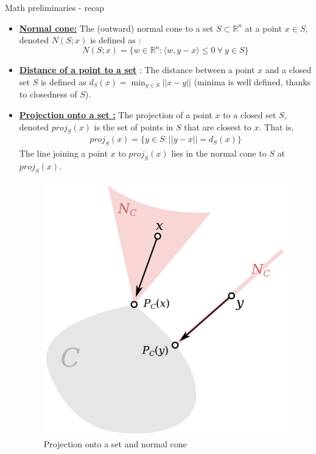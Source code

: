 \documentclass[8pt,aspectratio=169]{beamer}
\begin{document}
\begin{frame}{Math preliminaries - recap}
    \begin{itemize}
        \item \textbf{\underline{Normal cone:}} The (outward) normal cone to a set $S\subset \mathbb{R}^n$ at a point $x \in S$, denoted $N(S; x)$ is defined as :
            \begin{equation*}
                N(S; x) = \{ w \in \mathbb{R}^n : \langle w, y-x\rangle \leq 0 \ \forall \ y \in S \}
            \end{equation*}
        \item \textbf{\underline{Distance of a point to a set}} : The distance between a point $x$ and a closed set $S$ is defined as $d_S(x) = \min_{y\in S}||x-y||$ (minima is well defined, thanks to closedness of $S$).
        \item \textbf{\underline{Projection onto a set :}} The projection of a point $x$ to a closed set $S$, denoted $proj_S(x)$ is the set of points in $S$ that are closest to $x$. That is, 
        \begin{align*}
            proj_S(x) = \{y\in S : ||y-x|| = d_S(x)\}
        \end{align*}
        The line joining a point $x$ to $proj_S(x)$ lies in the normal cone to $S$ at $proj_S(x)$.
        \begin{figure}[h]
            \centering
            \includegraphics[width=0.2\linewidth]{projection.png}
            \caption{Projection onto a set and normal cone}
            \label{fig:enter-label}
        \end{figure}
    \end{itemize}
    
\end{frame}
\end{document}
